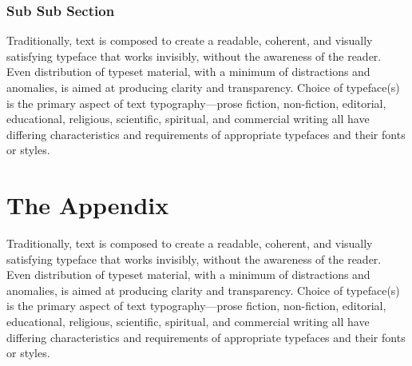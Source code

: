 \documentclass[twoside]{xarticle}
\begin{document}
\subsubsection{Sub Sub Section}

Traditionally, text is composed to create a readable, coherent, and visually
satisfying typeface that works invisibly, without the awareness of the reader.
Even distribution of typeset material, with a minimum of distractions and
anomalies, is aimed at producing clarity and transparency. Choice of typeface(s)
is the primary aspect of text typography—prose fiction, non-fiction, editorial,
educational, religious, scientific, spiritual, and commercial writing all have
differing characteristics and requirements of appropriate typefaces and their
fonts or styles.

\clearpage

\appendix

\section{The Appendix}
\thispagestyle{empty}

Traditionally, text is composed to create a readable, coherent, and visually
satisfying typeface that works invisibly, without the awareness of the reader.
Even distribution of typeset material, with a minimum of distractions and
anomalies, is aimed at producing clarity and transparency. Choice of typeface(s)
is the primary aspect of text typography—prose fiction, non-fiction, editorial,
educational, religious, scientific, spiritual, and commercial writing all have
differing characteristics and requirements of appropriate typefaces and their
fonts or styles.
\end{document}

